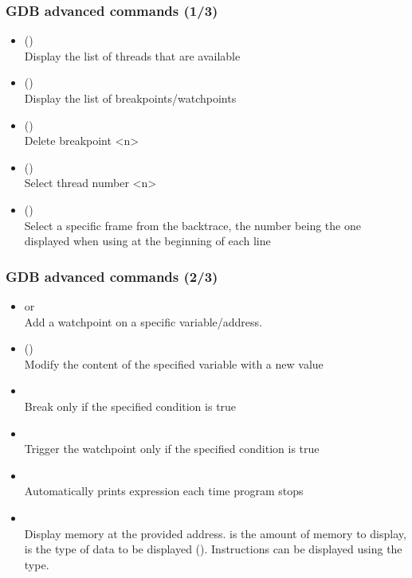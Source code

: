 \begin{frame}
  \frametitle{GDB advanced commands (1/3)}
  \small
  \begin{itemize}
    \item {} ()\\
      Display the list of threads that are available
    \item {} ()\\
      Display the list of breakpoints/watchpoints
    \item {} ()\\
      Delete breakpoint <n>
    \item {} ()\\
      Select thread number <n>
    \item {} ()\\
      Select a specific frame from the backtrace, the number being the one
      displayed when using  at the beginning of each line
  \end{itemize}
\end{frame}

\begin{frame}
  \frametitle{GDB advanced commands (2/3)}
  \small
  \begin{itemize}
    \item {} or \\
      Add a watchpoint on a specific variable/address.
    \item {} ()\\
      Modify the content of the specified variable with a new value
    \item {}\\
      Break only if the specified condition is true
    \item {}\\
      Trigger the watchpoint only if the specified condition is true
    \item {}\\
      Automatically prints expression each time program stops
    \item {}\\
      Display memory at the provided address.  is the amount of memory to
      display,  is the type of data to be displayed ().
      Instructions can be displayed using the  type.
  \end{itemize}
\end{frame}

